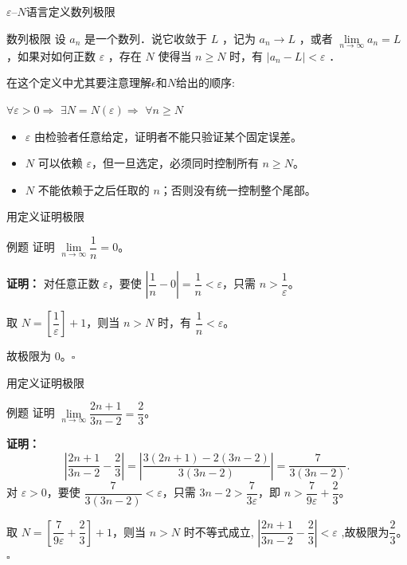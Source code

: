 \documentclass[aspectratio=169,10pt]{ctexbeamer}
\newcommand{\eps}{\varepsilon}
\begin{document}
\begin{frame}{ $\eps$--$N$语言定义数列极限}
  \begin{block}{数列极限}
    设 $a_n$ 是一个数列．说它收敛于 $L$ ，记为 $a_n \rightarrow L$ ，或者 $\lim \limits_{n \to \infty} a_n=L$ ，如果对如何正数 $\varepsilon$ ，存在 $N$ 使得当 $n \geqslant N$ 时，有 $\left|a_n-L\right|<\varepsilon$ ．
  \end{block}
在这个定义中尤其要注意理解$\epsilon$和$N$给出的顺序:
\begin{center}
	\Large
	$\forall\eps>0 \Rightarrow$
	$\exists N=N(\eps) \Rightarrow$
	$\forall n\ge N$
\end{center}

 \begin{itemize}
	\item $\eps$ 由检验者任意给定，证明者不能只验证某个固定误差。
	\item $N$ 可以依赖 $\eps$，但一旦选定，必须同时控制所有 $n\ge N$。
	\item $N$ 不能依赖于之后任取的 $n$；否则没有统一控制整个尾部。
\end{itemize}


\end{frame}




\begin{frame}{用定义证明极限}
  
  \begin{block}{例题}
   证明 \(\lim\limits_{n\to\infty} \dfrac{1}{n} = 0\)。
  \end{block}
  \pause
  \vspace{0.7cm}
  \textbf{证明：}
  对任意正数 \(\varepsilon \)，要使 \(\left|\dfrac{1}{n} - 0\right| = \dfrac{1}{n} < \varepsilon\)，只需 \(n > \dfrac{1}{\varepsilon}\)。
  
  取 \(N = \left[ \dfrac{1}{\varepsilon} \right] + 1\)，则当 \(n > N\) 时，有 \(\dfrac{1}{n} < \varepsilon\)。
  
  故极限为 0。\(\square\)
  
  
  
  
\end{frame}

\begin{frame}{用定义证明极限}
  \begin{block}{例题}
  	证明 \(\lim\limits_{n\to\infty} \dfrac{2n+1}{3n-2} = \dfrac{2}{3}\)。
  \end{block}
  \pause
  \vspace{0.7cm}
   \textbf{证明：}
  \[
  \left|\dfrac{2n+1}{3n-2} - \dfrac{2}{3}\right| = \left|\dfrac{3(2n+1)-2(3n-2)}{3(3n-2)}\right| = \dfrac{7}{3(3n-2)}.
  \]
  对 \(\varepsilon > 0\)，要使 \(\dfrac{7}{3(3n-2)} < \varepsilon\)，只需 \(3n-2 > \dfrac{7}{3\varepsilon}\)，即 \(n > \dfrac{7}{9\varepsilon} + \dfrac{2}{3}\)。
  
  
  取 \(N = \left  [     \dfrac{7}{9\varepsilon} + \dfrac{2}{3} \right] +1 \)，则当 \(n > N\) 时不等式成立, $|\dfrac{2n+1}{3n-2} - \dfrac{2}{3}| < \varepsilon$  ,故极限为$\dfrac{2}{3}$。\(\square\)
\end{frame}
\end{document}
